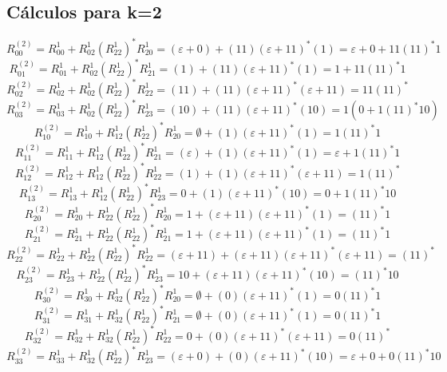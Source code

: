 \documentclass[11pt]{article}
\begin{document}
		\subsection{Cálculos para k=2}
			\[R_{00}^{(2)}=R_{00}^{1}+R_{02}^{1}{(R_{22}^{1})}^\ast R_{20}^{1}=(\varepsilon+0)+(11)(\varepsilon+11)^\ast(1)=\varepsilon+0+11(11)^\ast1\]
			\[R_{01}^{(2)}=R_{01}^{1}+R_{02}^{1}{(R_{22}^{1})}^\ast R_{21}^{1}=(1)+(11)(\varepsilon+11)^\ast(1)=1+11(11)^\ast1\]
			\[R_{02}^{(2)}=R_{02}^{1}+R_{02}^{1}{(R_{22}^{1})}^\ast R_{22}^{1}=(11)+(11)(\varepsilon+11)^\ast(\varepsilon+11)=11(11)^\ast\]
			\[R_{03}^{(2)}=R_{03}^{1}+R_{02}^{1}{(R_{22}^{1})}^\ast R_{23}^{1}=(10)+(11)(\varepsilon+11)^\ast(10)=1(0+1(11)^\ast10)\]
			\[R_{10}^{(2)}=R_{10}^{1}+R_{12}^{1}{(R_{22}^{1})}^\ast R_{20}^{1}=\emptyset+(1)(\varepsilon+11)^\ast(1)=1(11)^\ast1\]
			\[R_{11}^{(2)}=R_{11}^{1}+R_{12}^{1}{(R_{22}^{1})}^\ast R_{21}^{1}=(\varepsilon)+(1)(\varepsilon+11)^\ast(1)=\varepsilon+1(11)^\ast1\]
			\[R_{12}^{(2)}=R_{12}^{1}+R_{12}^{1}{(R_{22}^{1})}^\ast R_{22}^{1}=(1)+(1)(\varepsilon+11)^\ast(\varepsilon+11)=1(11)^\ast\]
			\[R_{13}^{(2)}=R_{13}^{1}+R_{12}^{1}{(R_{22}^{1})}^\ast R_{23}^{1}=0+(1)(\varepsilon+11)^\ast(10)=0+1(11)^\ast10\]
			\[R_{20}^{(2)}=R_{20}^{1}+R_{22}^{1}{(R_{22}^{1})}^\ast R_{20}^{1}=1+(\varepsilon+11)(\varepsilon+11)^\ast(1)=(11)^\ast1\]
			\[R_{21}^{(2)}=R_{21}^{1}+R_{22}^{1}{(R_{22}^{1})}^\ast R_{21}^{1}=1+(\varepsilon+11)(\varepsilon+11)^\ast(1)=(11)^\ast1\]
			\[R_{22}^{(2)}=R_{22}^{1}+R_{22}^{1}{(R_{22}^{1})}^\ast R_{22}^{1}=(\varepsilon+11)+(\varepsilon+11)(\varepsilon+11)^\ast(\varepsilon+11)=(11)^\ast\]
			\[R_{23}^{(2)}=R_{23}^{1}+R_{22}^{1}{(R_{22}^{1})}^\ast R_{23}^{1}=10+(\varepsilon+11)(\varepsilon+11)^\ast(10)=(11)^\ast10\]
			\[R_{30}^{(2)}=R_{30}^{1}+R_{32}^{1}{(R_{22}^{1})}^\ast R_{20}^{1}=\emptyset+(0)(\varepsilon+11)^\ast(1)=0(11)^\ast1\]
			\[R_{31}^{(2)}=R_{31}^{1}+R_{32}^{1}{(R_{22}^{1})}^\ast R_{21}^{1}=\emptyset+(0)(\varepsilon+11)^\ast(1)=0(11)^\ast1\]
			\[R_{32}^{(2)}=R_{32}^{1}+R_{32}^{1}{(R_{22}^{1})}^\ast R_{22}^{1}=0+(0)(\varepsilon+11)^\ast(\varepsilon+11)=0(11)^\ast\]
			\[R_{33}^{(2)}=R_{33}^{1}+R_{32}^{1}{(R_{22}^{1})}^\ast R_{23}^{1}=(\varepsilon+0)+(0)(\varepsilon+11)^\ast(10)=\varepsilon+0+0(11)^\ast10\]
\end{document}
